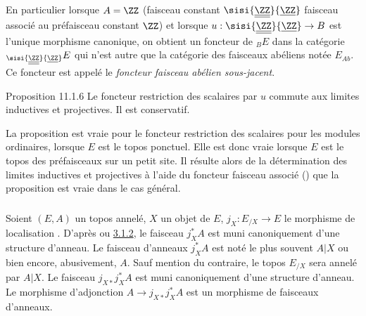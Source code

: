 \documentclass[10pt]{../fichiers-configuration-latex/smfart}
\begin{document}
\subsubsection{}
En particulier lorsque $A=\ZZ$ (faisceau constant $\sisi{\underline{\underline{\ZZ}}}{\underline{\ZZ}}$ \ie faisceau
associé au préfaisceau constant $\ZZ$) et lorsque $u:\sisi{\underline{\underline{\ZZ}}}{\underline{\ZZ}}\rightarrow B$
est l'unique morphisme canonique, on obtient un foncteur de ${}_BE$
dans la catégorie ${}_{\sisi{\underline{\underline{\ZZ}}}{\underline{\ZZ}}}E$ qui n'est autre que la catégorie des
faisceaux abéliens notée $E_{Ab}$. Ce foncteur est appelé le
\emph{foncteur faisceau abélien sous-jacent}.

\begin{enonce*}{Proposition 11.1.6}
Le foncteur restriction des scalaires par $u$ commute aux limites
inductives et projectives. Il est conservatif.
\end{enonce*}

La proposition est vraie pour le foncteur restriction des scalaires
pour les modules ordinaires, \ie lorsque $E$ est le topos ponctuel.
Elle est donc vraie lorsque $E$ est le topos des préfaisceaux sur un
petit site. Il résulte alors de la détermination des limites
inductives et projectives à l'aide du foncteur faisceau associé
() que la proposition est vraie dans le cas général.

\setcounter{subsection}{2} \setcounter{subsubsection}{0}
\subsubsection{}
Soient $(E,A)$ un topos annelé, $X$ un objet de $E$,
$j_X:E_{/X}\rightarrow E$ le morphisme de localisation
. D'après  ou
\hyperref[IV.subsubsec3.1.2]{3.1.2}, le faisceau $j^{\ast}_XA$ est muni
canoniquement d'une structure d'anneau. Le faisceau d'anneaux
$j^{\ast}_XA$ est noté le plus souvent $A| X$ ou bien encore,
abusivement, $A$. Sauf mention du contraire, le topos $E_{/X}$ sera
annelé par $A| X$. Le faisceau $j_{X\ast}j^{\ast}_XA$ est muni
canoniquement d'une structure d'anneau. Le morphisme d'adjonction
$A\rightarrow j_{X\ast}j^{\ast}_XA$ est un morphisme de faisceaux
d'anneaux.
\end{document}
